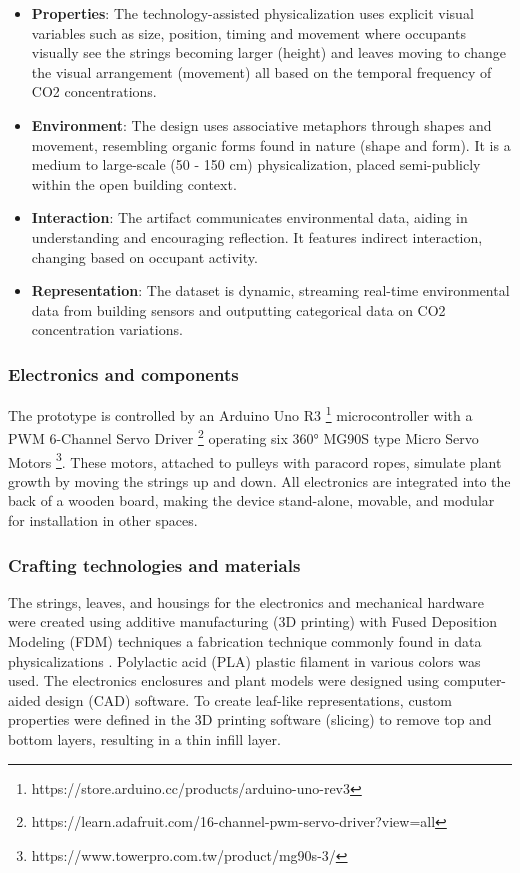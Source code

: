 \begin{itemize}
  \item \textbf{Properties}: The technology-assisted physicalization uses explicit visual variables such as size, position, timing and movement where occupants visually see the strings becoming larger (height) and leaves moving to change the visual arrangement (movement) all based on the temporal frequency of CO2 concentrations.
  \item \textbf{Environment}: The design uses associative metaphors through shapes and movement, resembling organic forms found in nature (shape and form). It is a medium to large-scale (50 - 150 cm) physicalization, placed semi-publicly within the open building context.
  \item \textbf{Interaction}: The artifact communicates environmental data, aiding in understanding and encouraging reflection. It features indirect interaction, changing based on occupant activity.
  \item \textbf{Representation}: The dataset is dynamic, streaming real-time environmental data from building sensors and outputting categorical data on CO2 concentration variations.
\end{itemize}

\subsubsection{Electronics and components}

The prototype is controlled by an Arduino Uno R3 \footnote{https://store.arduino.cc/products/arduino-uno-rev3} microcontroller with a PWM 6-Channel Servo Driver \footnote{https://learn.adafruit.com/16-channel-pwm-servo-driver?view=all} operating six 360° MG90S type Micro Servo Motors \footnote{https://www.towerpro.com.tw/product/mg90s-3/}. These motors, attached to pulleys with paracord ropes, simulate plant growth by moving the strings up and down. All electronics are integrated into the back of a wooden board, making the device stand-alone, movable, and modular for installation in other spaces.

\subsubsection{Crafting technologies and materials}
The strings, leaves, and housings for the electronics and mechanical hardware were created using additive manufacturing (3D printing) with Fused Deposition Modeling (FDM) techniques a fabrication technique commonly found in data physicalizations \cite{anhalt_university_germany_design_2022}. Polylactic acid (PLA) plastic filament in various colors was used. The electronics enclosures and plant models were designed using computer-aided design (CAD) software. To create leaf-like representations, custom properties were defined in the 3D printing software (slicing) to remove top and bottom layers, resulting in a thin infill layer.

